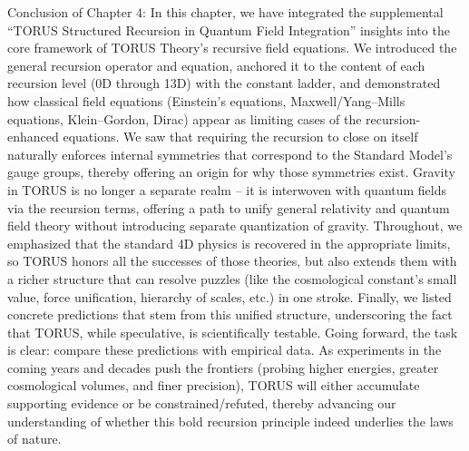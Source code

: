 \documentclass[
]{article}
\begin{document}
Conclusion of Chapter 4: In this chapter, we have integrated the
supplemental ``TORUS Structured Recursion in Quantum Field Integration''
insights into the core framework of TORUS Theory's recursive field
equations. We introduced the general recursion operator and equation,
anchored it to the content of each recursion level (0D through 13D) with
the constant ladder, and demonstrated how classical field equations
(Einstein's equations, Maxwell/Yang--Mills equations, Klein--Gordon,
Dirac) appear as limiting cases of the recursion-enhanced equations. We
saw that requiring the recursion to close on itself naturally enforces
internal symmetries that correspond to the Standard Model's gauge
groups, thereby offering an origin for why those symmetries exist.
Gravity in TORUS is no longer a separate realm -- it is interwoven with
quantum fields via the recursion terms, offering a path to unify general
relativity and quantum field theory without introducing separate
quantization of gravity. Throughout, we emphasized that the standard 4D
physics is recovered in the appropriate limits, so TORUS honors all the
successes of those theories, but also extends them with a richer
structure that can resolve puzzles (like the cosmological constant's
small value, force unification, hierarchy of scales, etc.) in one
stroke. Finally, we listed concrete predictions that stem from this
unified structure, underscoring the fact that TORUS, while speculative,
is scientifically testable. Going forward, the task is clear: compare
these predictions with empirical data. As experiments in the coming
years and decades push the frontiers (probing higher energies, greater
cosmological volumes, and finer precision), TORUS will either accumulate
supporting evidence or be constrained/refuted, thereby advancing our
understanding of whether this bold recursion principle indeed underlies
the laws of nature.
\end{document}
